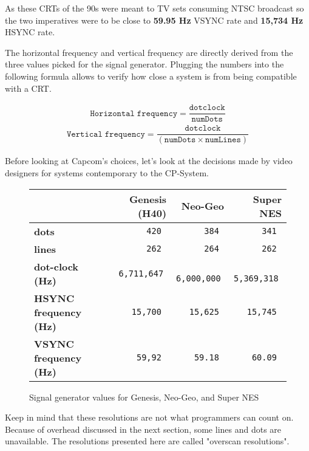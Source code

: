 As these CRTs of the 90s were meant to TV sets consuming NTSC broadcast so the two imperatives were to be close to \textbf{59.95 Hz} VSYNC rate and \textbf{15,734 Hz} HSYNC rate. 



The horizontal frequency and vertical frequency are directly derived from the three values picked for the signal generator. Plugging the numbers into the following formula allows to verify how close a system is from being compatible with a CRT.

\begin{align*}
 \mathtt{Horizontal\; frequency} = \dfrac{\mathtt{dotclock}}{\mathtt{numDots}}
\end{align*}
\begin{align*}
\mathtt{Vertical\; frequency} =   \dfrac{\mathtt{dotclock}}{\mathtt{(numDots \times numLines)}}
\end{align*}


Before looking at Capcom's choices, let's look at the decisions made by video designers for systems contemporary to the CP-System. 


\begin{figure}[H]
{ \setlength{\tabcolsep}{3.0pt}
\begin{tabularx}{\textwidth}{Xrrr} 
  \textbf{ } & \textbf{Genesis (H40)\cite{h40}} & \textbf{ Neo-Geo }  & \textbf{ Super NES } \\               
  \toprule    
   \textbf{dots} & \texttt{ 420 } & \texttt{ 384 }  & \texttt{ 341 } \\ 
   \textbf{lines} & \texttt{ 262 } & \texttt{ 264 }  & \texttt{ 262 } \\ 
   \textbf{dot-clock (Hz)} & \texttt{  6,711,647 } & \texttt{ 6,000,000 }  & \texttt{ 5,369,318 } \\ 
\toprule    
   \textbf{HSYNC frequency (Hz) } & \texttt{ 15,700 } & \texttt{ 15,625 }  & \texttt{ 15,745 } \\ 
   \textbf{VSYNC frequency (Hz) } & \texttt{ 59,92 } & \texttt{ 59.18 }  & \texttt{ 60.09 } \\ 
\toprule    

\end{tabularx}%
}\caption*{Signal generator values for Genesis, Neo-Geo, and Super NES}
\end{figure}

Keep in mind that these resolutions are not what programmers can count on. Because of overhead discussed in the next section, some lines and dots are unavailable. The resolutions presented here are called "overscan resolutions".


